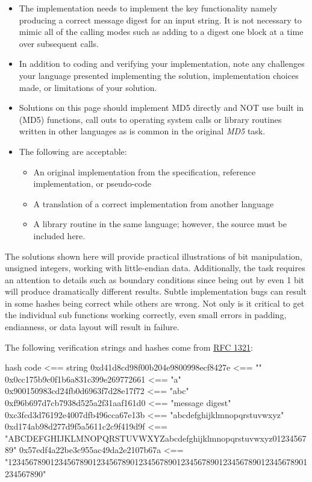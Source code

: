 \begin{itemize}
\item
  The implementation needs to implement the key functionality namely
  producing a correct message digest for an input string. It is not
  necessary to mimic all of the calling modes such as adding to a digest
  one block at a time over subsequent calls.
\item
  In addition to coding and verifying your implementation, note any
  challenges your language presented implementing the solution,
  implementation choices made, or limitations of your solution.
\item
  Solutions on this page should implement MD5 directly and NOT use built
  in (MD5) functions, call outs to operating system calls or library
  routines written in other languages as is common in the original
  \emph{MD5} task.
\item
  The following are acceptable:

  \begin{itemize}
  \item
    An original implementation from the specification, reference
    implementation, or pseudo-code
  \item
    A translation of a correct implementation from another language
  \item
    A library routine in the same language; however, the source must be
    included here.
  \end{itemize}
\end{itemize}

The solutions shown here will provide practical illustrations of bit
manipulation, unsigned integers, working with little-endian data.
Additionally, the task requires an attention to details such as boundary
conditions since being out by even 1 bit will produce dramatically
different results. Subtle implementation bugs can result in some hashes
being correct while others are wrong. Not only is it critical to get the
individual sub functions working correctly, even small errors in
padding, endianness, or data layout will result in failure.

The following verification strings and hashes come from
\href{//tools.ietf.org/html/rfc1321}{RFC 1321}:

\begin{wideverbatim}
                            hash code <== string 
   0xd41d8cd98f00b204e9800998ecf8427e <== ""  
   0x0cc175b9c0f1b6a831c399e269772661 <== "a"
   0x900150983cd24fb0d6963f7d28e17f72 <== "abc"
   0xf96b697d7cb7938d525a2f31aaf161d0 <== "message digest"
   0xc3fcd3d76192e4007dfb496cca67e13b <== "abcdefghijklmnopqrstuvwxyz"
   0xd174ab98d277d9f5a5611c2c9f419d9f <== 
   "ABCDEFGHIJKLMNOPQRSTUVWXYZabcdefghijklmnopqrstuvwxyz0123456789"
   0x57edf4a22be3c955ac49da2e2107b67a <==
   "12345678901234567890123456789012345678901234567890123456789012345678901234567890"
\end{wideverbatim}

